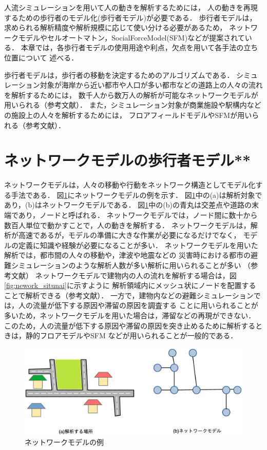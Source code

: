 %
人流シミュレーションを用いて人の動きを解析するためには，
人の動きを再現するための歩行者のモデル化(歩行者モデル)が必要である．
歩行者モデルは，求められる解析精度や解析規模に応じて使い分ける必要があるため，
ネットワークモデルやセルオートマトン，SocialForceModel(SFM)などが提案されている．
本章では，各歩行者モデルの使用用途や利点，欠点を用いて各手法の立ち位置について
述べる．

歩行者モデルは，歩行者の移動を決定するためのアルゴリズムである．
シミュレーション対象が海岸から近い都市や人口が多い都市などの道路上の人々の流れを解析するためには，
数千人から数万人の解析が可能なネットワークモデルが用いられる（参考文献）．
また，シミュレーション対象が商業施設や駅構内などの施設上の人々を解析するためには，
フロアフィールドモデルやSFMが用いられる（参考文献）．
\fi

\section{ネットワークモデルの歩行者モデル**}
ネットワークモデルは，人々の移動や行動をネットワーク構造としてモデル化する手法である．
図\ref{fig:network_ex}にネットワークモデルの例を示す．
図\ref{fig:network_ex}中の(a)は解析対象であり，(b)はネットワークモデルである．
図\ref{fig:network_ex}中の(b)の青丸は交差点や道路の末端であり，ノードと呼ばれる．
ネットワークモデルでは，ノード間に数十から数百人単位で動かすことで，人の動きを解析する．
ネットワークモデルは，解析が高速であるが，モデルの準備に大きな作業が必要になるだけでなく，
モデルの定義に知識や経験が必要になることが多い．
ネットワークモデルを用いた解析では，都市間の人々の移動や，津波や地震などの
災害時における都市の避難シミュレーションのような解析人数が多い解析に用いられることが多い
（参考文献）
ネットワークモデルで建物内の人の流れを解析する場合は，図\ref{fig:nework_situnai}に示すように
解析領域内にメッシュ状にノードを配置することで解析できる（参考文献）．
一方で，建物内などの避難シミュレーションでは，人の流量が低下する原因や滞留の原因を調査する
ことに用いられることが多いため，ネットワークモデルを用いた場合は，滞留などの再現ができない．
このため，人の流量が低下する原因や滞留の原因を突き止めるために解析するときは，静的フロアモデルやSFM
などが用いられることが一般的である．


%
\begin{figure}[h]
    \begin{center}
     \includegraphics[width=14cm,clip]{figure/networkmodel_ex.eps}
     \caption{ネットワークモデルの例}
     \label{fig:network_ex}
    \end{center}
\end{figure}
%
\clearpage
